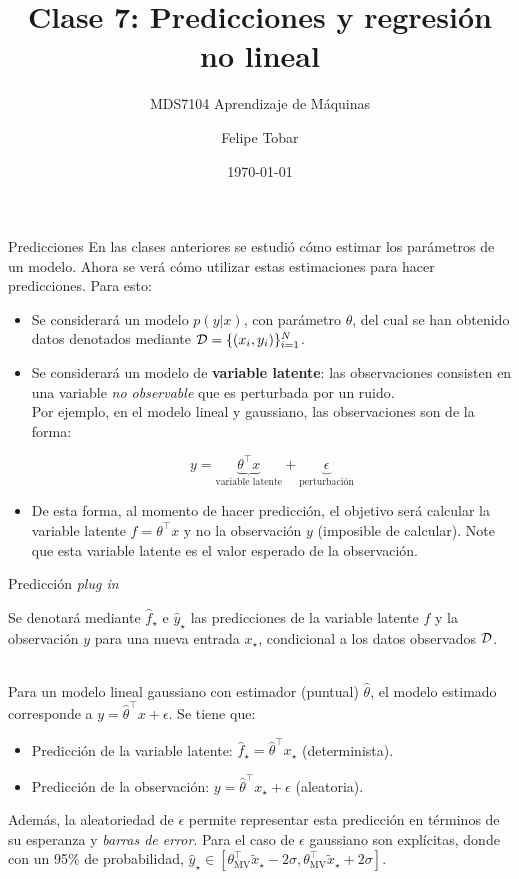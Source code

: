 \documentclass[9pt, handout]{beamer}
\title{Clase 7: Predicciones y regresión no lineal}
\subtitle{MDS7104 Aprendizaje de Máquinas}
\date{\today}
\author{Felipe Tobar}
\institute{Iniciativa de Datos e Inteligencia Artificial\\Universidad de Chile}
\begin{document}
\begin{frame}
  \titlepage
\end{frame}

\begin{frame}{Predicciones}
	En las clases anteriores se estudió cómo estimar los parámetros de un modelo. Ahora se verá cómo utilizar estas estimaciones para hacer predicciones. Para esto:
	
	\begin{itemize}
		\item Se considerará un modelo $p(y|x)$, con parámetro $\theta$, del cual se han obtenido datos denotados mediante ${\mathcal D} = \{(x_i,y_i)\}_{i=1}^N$.\pause
		\item Se considerará un modelo de \textbf{variable latente}: las observaciones consisten en una variable \emph{no observable} que es perturbada por un ruido. \\
		Por ejemplo, en el modelo lineal y gaussiano, las observaciones son de la forma:

			\begin{equation*}
				y= \underbrace{\theta^\top x}_{\text{variable latente}} + \underbrace{\epsilon}_{\text{perturbación}}
			\end{equation*}\pause
		\item De esta forma, al momento de hacer predicción, el objetivo será calcular la variable latente $f=\theta^\top x$ y no la observación $y$ (imposible de calcular). Note que esta variable latente es el valor esperado de la observación.
	\end{itemize}
	
\end{frame}

\begin{frame}{Predicción \emph{plug in}}

Se denotará mediante $\hat f_\star$ e $\hat y_\star$ las predicciones de la variable latente $f$ y la observación $y$ para una nueva entrada $x_\star$, condicional a los datos observados ${\mathcal D}$.\\~\ \pause

Para un modelo lineal gaussiano con estimador (puntual) $\hat{\theta}$, el modelo estimado corresponde a $y=\hat{\theta}^\top x + \epsilon$. \pause Se tiene que:

\begin{itemize}
	\item Predicción de la variable latente: $\hat f_\star=\hat{\theta}^\top x_\star$ (determinista).\pause
	\item Predicción de la observación: $y=\hat{\theta}^\top x_\star + \epsilon$ (aleatoria).\pause
\end{itemize}
\vspace{1em}
Además, la aleatoriedad de $\epsilon$ permite representar esta predicción en términos de su esperanza y \emph{barras de error}. Para el caso de $\epsilon$ gaussiano son explícitas, donde con un 95\% de probabilidad, $\hat y_\star\in[\theta_{\text{MV}}^\top \tilde{x}_\star - 2\sigma,\theta_{\text{MV}}^\top \tilde{x}_\star + 2\sigma]$.
	
\end{frame}
\end{document}
